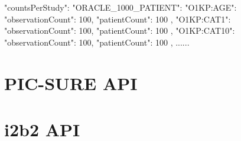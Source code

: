{
  "countsPerStudy": {
    "ORACLE_1000_PATIENT": {
      "O1KP:AGE": {
        "observationCount": 100,
        "patientCount": 100
      },
      "O1KP:CAT1": {
        "observationCount": 100,
        "patientCount": 100
      },
      "O1KP:CAT10": {
        "observationCount": 100,
        "patientCount": 100
      },
      ......
    }
  }
}



\section{PIC-SURE API}





\section{i2b2 API}
